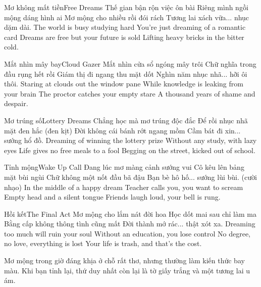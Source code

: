 \begin{tutuyetbox}{Mơ không mất tiền}{Free Dreams}
Thế gian bận rộn việc ôn bài
Riêng mình ngồi mộng dáng hình ai
Mơ mộng cho nhiều rồi đói rách
Tương lai xách vữa... nhục dặm dài.
\tcblower
The world is busy studying hard
You're just dreaming of a romantic card
Dreams are free but your future is sold
Lifting heavy bricks in the bitter cold.
\end{tutuyetbox}

\begin{tutuyetbox}{Mắt nhìn mây bay}{Cloud Gazer}
Mắt nhìn cửa sổ ngóng mây trôi
Chữ nghĩa trong đầu rụng hết rồi
Giám thị đi ngang thu mặt dốt
Nghìn năm nhục nhã... hỡi ôi thôi.
\tcblower
Staring at clouds out the window pane
While knowledge is leaking from your brain
The proctor catches your empty stare
A thousand years of shame and despair.
\end{tutuyetbox}

\begin{tutuyetbox}{Mơ trúng số}{Lottery Dreams}
Chẳng học mà mơ trúng độc đắc
Để rồi nhục nhã mặt đen hắc (đen kịt)
Đời không cái bánh rớt ngang mồm
Cầm bát đi xin... sướng hổ đồ.
\tcblower
Dreaming of winning the lottery prize
Without any study, with lazy eyes
Life gives no free meals to a fool
Begging on the street, kicked out of school.
\end{tutuyetbox}

\begin{tutuyetbox}{Tỉnh mộng}{Wake Up Call}
Đang lúc mơ màng cảnh sướng vui
Cô kêu lên bảng mặt bùi ngùi
Chữ không một nốt đầu bã đậu
Bạn bè hô hố... sướng lùi bùi. (cười nhạo)
\tcblower
In the middle of a happy dream
Teacher calls you, you want to scream
Empty head and a silent tongue
Friends laugh loud, your bell is rung.
\end{tutuyetbox}

\begin{tutuyetbox}{Hồi kết}{The Final Act}
Mơ mộng cho lắm nát đời hoa
Học dốt mai sau chỉ làm ma
Bằng cấp không thông tình cũng mất
Đời thành mớ rác... thật xót xa.
\tcblower
Dreaming too much will ruin your soul
Without an education, you lose control
No degree, no love, everything is lost
Your life is trash, and that's the cost.
\end{tutuyetbox}

\begin{ghichu}
Mơ mộng trong giờ đáng khịa ở chỗ rất thơ, nhưng thường làm kiến thức bay màu. Khi bạn tỉnh lại, thứ duy nhất còn lại là tờ giấy trắng và một tương lai u ám.
\end{ghichu}